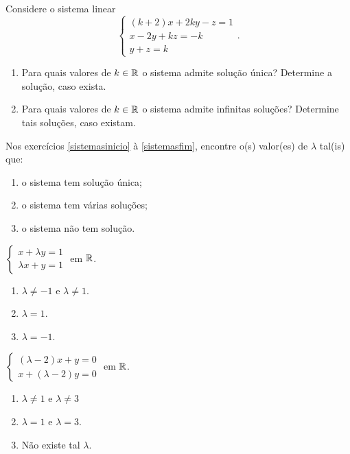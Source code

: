 \documentclass[12pt]{exam}
\begin{document}
\begin{exercicio}
  Considere o sistema linear
  \[
    \begin{cases}
      (k + 2)x + 2ky - z = 1\\
      x - 2y + kz = -k\\
      y + z = k
    \end{cases}.
  \]
  \begin{enumerate}[label={\alph*})]
    \item Para quais valores de $k \in \mathbb{R}$ o sistema admite solução única? Determine a solução, caso exista.
    \item Para quais valores de $k \in \mathbb{R}$ o sistema admite infinitas soluções? Determine tais soluções, caso existam.
  \end{enumerate}
\end{exercicio}

Nos exercícios \ref{sistemasinicio} à \ref{sistemasfim}, encontre o(s) valor(es) de $\lambda$ tal(is) que:
\begin{enumerate}[label={\alph*})]
  \item o sistema tem solução única;
  \item o sistema tem várias soluções;
  \item o sistema não tem solução.
\end{enumerate}

\begin{exercicio}\label{sistemasinicio}
  $
    \begin{cases}
      x + \lambda y = 1\\
      \lambda x + y = 1
    \end{cases}
  $
  em $\mathbb{R}$.
  \begin{solucao}
    \begin{enumerate}[label={\alph*})]
      \item $\lambda \ne -1$ e $\lambda \ne 1$.
      \item $\lambda = 1$.
      \item $\lambda = -1$.
    \end{enumerate}
  \end{solucao}
\end{exercicio}

\begin{exercicio}
  $
    \begin{cases}
      (\lambda - 2)x + y = 0\\
      x + (\lambda - 2)y = 0
    \end{cases}
  $
  em $\mathbb{R}$.
  \begin{solucao}
    \begin{enumerate}[label={\alph*})]
      \item $\lambda \ne 1$ e $\lambda \ne 3$
      \item $\lambda = 1$ e $\lambda = 3$.
      \item Não existe tal $\lambda$.
    \end{enumerate}
  \end{solucao}
\end{exercicio}
\end{document}
